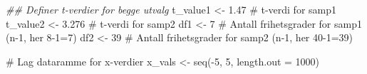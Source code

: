 \documentclass[
  letterpaper,
  DIV=11,
  numbers=noendperiod]{scrreprt}
\newenvironment{Shaded}{\begin{snugshade}}{\end{snugshade}}
\newcommand{\AttributeTok}[1]{\textcolor[rgb]{0.40,0.45,0.13}{#1}}
\newcommand{\CommentTok}[1]{\textcolor[rgb]{0.37,0.37,0.37}{#1}}
\newcommand{\DecValTok}[1]{\textcolor[rgb]{0.68,0.00,0.00}{#1}}
\newcommand{\DocumentationTok}[1]{\textcolor[rgb]{0.37,0.37,0.37}{\textit{#1}}}
\newcommand{\FloatTok}[1]{\textcolor[rgb]{0.68,0.00,0.00}{#1}}
\newcommand{\FunctionTok}[1]{\textcolor[rgb]{0.28,0.35,0.67}{#1}}
\newcommand{\NormalTok}[1]{\textcolor[rgb]{0.00,0.23,0.31}{#1}}
\newcommand{\OtherTok}[1]{\textcolor[rgb]{0.00,0.23,0.31}{#1}}
\newcommand{\SpecialCharTok}[1]{\textcolor[rgb]{0.37,0.37,0.37}{#1}}
\begin{document}
\begin{Shaded}
\begin{Highlighting}[]
\DocumentationTok{\#\# Definer t{-}verdier for begge utvalg}
\NormalTok{t\_value1 }\OtherTok{\textless{}{-}} \FloatTok{1.47}  \CommentTok{\# t{-}verdi for samp1}
\NormalTok{t\_value2 }\OtherTok{\textless{}{-}} \FloatTok{3.276}  \CommentTok{\# t{-}verdi for samp2}
\NormalTok{df1 }\OtherTok{\textless{}{-}} \DecValTok{7}   \CommentTok{\# Antall frihetsgrader for samp1 (n{-}1, her 8{-}1=7)}
\NormalTok{df2 }\OtherTok{\textless{}{-}} \DecValTok{39}  \CommentTok{\# Antall frihetsgrader for samp2 (n{-}1, her 40{-}1=39)}

\CommentTok{\# Lag dataramme for x{-}verdier}
\NormalTok{x\_vals }\OtherTok{\textless{}{-}} \FunctionTok{seq}\NormalTok{(}\SpecialCharTok{{-}}\DecValTok{5}\NormalTok{, }\DecValTok{5}\NormalTok{, }\AttributeTok{length.out =} \DecValTok{1000}\NormalTok{)}


\end{Highlighting}
\end{Shaded}
\end{document}
